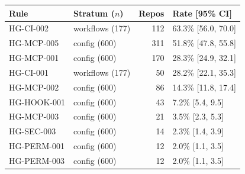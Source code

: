\begin{tabular}{llrl}
\toprule
Rule & Stratum ($n$) & Repos & Rate [95\% CI] \\
\midrule
HG-CI-002 & workflows (177) & 112 & 63.3\% [56.0, 70.0] \\
HG-MCP-005 & config (600) & 311 & 51.8\% [47.8, 55.8] \\
HG-MCP-001 & config (600) & 170 & 28.3\% [24.9, 32.1] \\
HG-CI-001 & workflows (177) & 50 & 28.2\% [22.1, 35.3] \\
HG-MCP-002 & config (600) & 86 & 14.3\% [11.8, 17.4] \\
HG-HOOK-001 & config (600) & 43 & 7.2\% [5.4, 9.5] \\
HG-MCP-003 & config (600) & 21 & 3.5\% [2.3, 5.3] \\
HG-SEC-003 & config (600) & 14 & 2.3\% [1.4, 3.9] \\
HG-PERM-001 & config (600) & 12 & 2.0\% [1.1, 3.5] \\
HG-PERM-003 & config (600) & 12 & 2.0\% [1.1, 3.5] \\
\bottomrule
\end{tabular}
